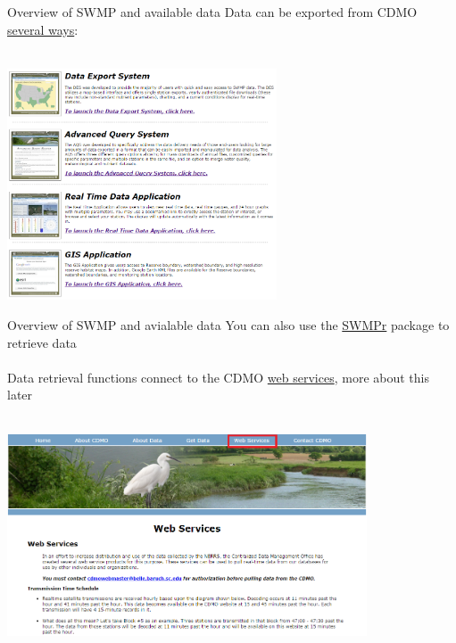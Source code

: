 \documentclass[xcolor=svgnames]{beamer}\usepackage[]{graphicx}\usepackage[]{color}
\begin{document}
\begin{frame}{Overview of SWMP and available data}
Data can be exported from CDMO \href{http://cdmo.baruch.sc.edu/get/landing.cfm}{several ways}:\\~\\
\centerline{\includegraphics[width = 0.6\textwidth]{get_data.png}}
\end{frame}

\begin{frame}{Overview of SWMP and avialable data}
You can also use the \href{https://github.com/fawda123/SWMPr}{SWMPr} package to retrieve data \\~\\
Data retrieval functions connect to the CDMO \href{http://cdmo.baruch.sc.edu/webservices.cfm}{web services}, more about this later \\~\\
\centerline{\includegraphics[width = 0.8\textwidth]{web_serv.png}}
\end{frame}
\end{document}
